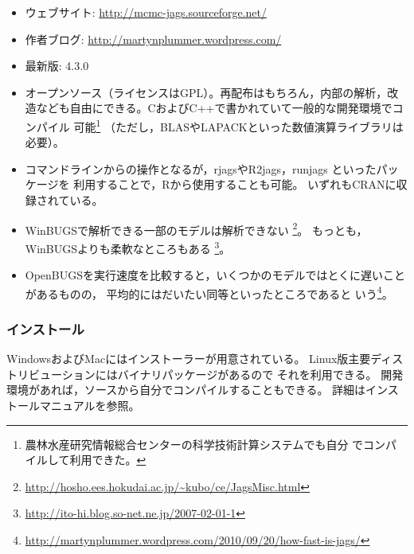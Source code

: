 \documentclass[11pt,uplatex]{jsarticle}
\begin{document}
\begin{itemize}

\item ウェブサイト:
  \url{http://mcmc-jags.sourceforge.net/}
  
\item 作者ブログ:
  \url{http://martynplummer.wordpress.com/}  

\item 最新版: 4.3.0

\item オープンソース（ライセンスはGPL）。再配布はもちろん，内部の解析，改
  造なども自由にできる。CおよびC++で書かれていて一般的な開発環境でコンパイル
  可能\footnote{農林水産研究情報総合センターの科学技術計算システムでも自分
  でコンパイルして利用できた。}
  （ただし，BLASやLAPACKといった数値演算ライブラリは必要）。

\item コマンドラインからの操作となるが，\textsf{rjags}や\textsf{R2jags}，\textsf{runjags}
といったパッケージを
利用することで，\textsf{R}から使用することも可能。
いずれもCRANに収録されている。

\item \textsf{WinBUGS}で解析できる一部のモデルは解析できない
  \footnote{\url{http://hosho.ees.hokudai.ac.jp/~kubo/ce/JagsMisc.html}}。
 もっとも，\textsf{WinBUGS}よりも柔軟なところもある
  \footnote{\url{http://ito-hi.blog.so-net.ne.jp/2007-02-01-1}}。
  
\item \textsf{OpenBUGS}を実行速度を比較すると，いくつかのモデルではとくに遅いことがあるものの，
平均的にはだいたい同等といったところであると
いう\footnote{\url{http://martynplummer.wordpress.com/2010/09/20/how-fast-is-jags/}}。

\end{itemize}

\subsubsection*{インストール}
WindowsおよびMacにはインストーラーが用意されている。
Linux版主要ディストリビューションにはバイナリパッケージがあるので
それを利用できる。
開発環境があれば，ソースから自分でコンパイルすることもできる。
詳細はインストールマニュアルを参照。

\end{document}
